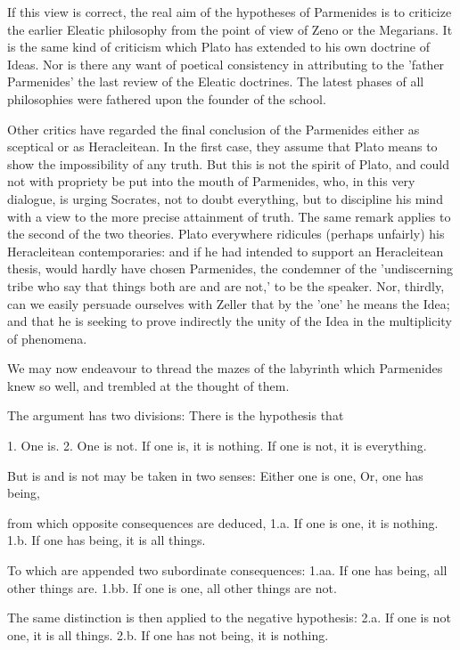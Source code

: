 If this view is correct, the real aim of the hypotheses of Parmenides
is to criticize the earlier Eleatic philosophy from the point of view of
Zeno or the Megarians. It is the same kind of criticism which Plato has
extended to his own doctrine of Ideas. Nor is there any want of poetical
consistency in attributing to the 'father Parmenides' the last review
of the Eleatic doctrines. The latest phases of all philosophies were
fathered upon the founder of the school.

Other critics have regarded the final conclusion of the Parmenides
either as sceptical or as Heracleitean. In the first case, they assume
that Plato means to show the impossibility of any truth. But this is not
the spirit of Plato, and could not with propriety be put into the mouth
of Parmenides, who, in this very dialogue, is urging Socrates, not to
doubt everything, but to discipline his mind with a view to the more
precise attainment of truth. The same remark applies to the second of
the two theories. Plato everywhere ridicules (perhaps unfairly) his
Heracleitean contemporaries: and if he had intended to support an
Heracleitean thesis, would hardly have chosen Parmenides, the condemner
of the 'undiscerning tribe who say that things both are and are not,'
to be the speaker. Nor, thirdly, can we easily persuade ourselves with
Zeller that by the 'one' he means the Idea; and that he is seeking to
prove indirectly the unity of the Idea in the multiplicity of phenomena.

We may now endeavour to thread the mazes of the labyrinth which
Parmenides knew so well, and trembled at the thought of them.

The argument has two divisions: There is the hypothesis that

     1.  One is.
     2.  One is not.
     If one is, it is nothing.
     If one is not, it is everything.

     But is and is not may be taken in two senses:
     Either one is one,
     Or, one has being,

     from which opposite consequences are deduced,
     1.a.  If one is one, it is nothing.
     1.b.  If one has being, it is all things.

     To which are appended two subordinate consequences:
     1.aa.  If one has being, all other things are.
     1.bb.  If one is one, all other things are not.

     The same distinction is then applied to the negative hypothesis:
     2.a.  If one is not one, it is all things.
     2.b.  If one has not being, it is nothing.

